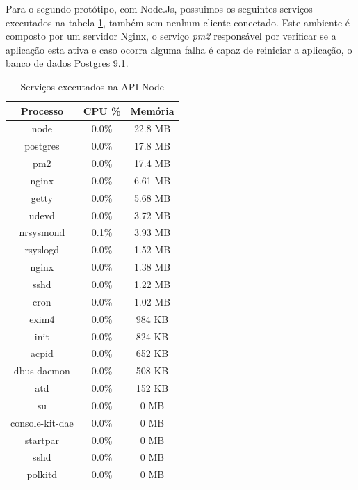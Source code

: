   \vspace{-1.9cm}

  Para o segundo protótipo, com Node.Js, possuimos os seguintes serviços executados na tabela \ref{tab:services-in-api-node}, 
  também sem nenhum cliente conectado. Este ambiente é composto por um servidor Nginx, o serviço \textit{pm2} responsável por
  verificar se a aplicação esta ativa e caso ocorra alguma falha é capaz de reiniciar a aplicação, 
  o banco de dados Postgres 9.1.
  
   \begin{table}[H]
    \centering
    \footnotesize
    \setlength{\abovecaptionskip}{0pt}
    \setlength{\belowcaptionskip}{0pt}
    \caption[Serviços executados na API Node]{Serviços executados na API Node}
    \label{tab:services-in-api-node}
    \begin{tabular}{c|c|c}
      \hline \hline
      Processo  & 	CPU \% &	Memória \\
      \hline \hline
      node &		0.0\% &		22.8 MB \\
      postgres &	0.0\% &		17.8 MB \\
      pm2 &		0.0\% &		17.4 MB \\
      nginx &		0.0\% &		6.61 MB \\
      getty &		0.0\% &		5.68 MB \\
      udevd &		0.0\% &		3.72 MB \\
      nrsysmond &	0.1\% &		3.93 MB \\
      rsyslogd &	0.0\% &		1.52 MB \\
      nginx &		0.0\% &		1.38 MB \\
      sshd &		0.0\% &		1.22 MB \\
      cron &		0.0\% &		1.02 MB \\
      exim4 &		0.0\% &		984 KB \\
      init &		0.0\% &		824 KB \\
      acpid &		0.0\% &		652 KB \\
      dbus-daemon &	0.0\% &		508 KB \\
      atd &		0.0\% &		152 KB \\
      su &		0.0\% &		0 MB \\
      console-kit-dae &	0.0\% &		0 MB \\
      startpar & 	0.0\% &		0 MB \\
      sshd &		0.0\% &		0 MB \\
      polkitd &		0.0\% &		0 MB \\
      \hline \hline
    \end{tabular}
  \end{table}
   
